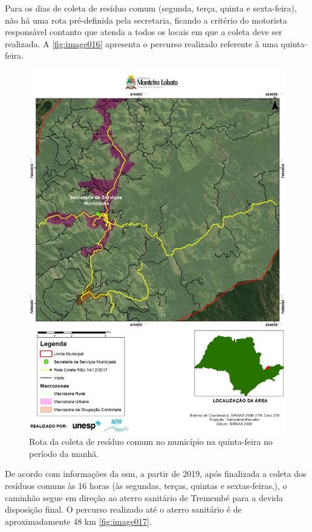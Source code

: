 Para os dias de coleta de resíduo comum (segunda, terça, quinta e sexta-feira), não há uma rota pré-definida pela secretaria, ficando a critério do motorista responsável contanto que atenda a todos os locais em que a coleta deve ser realizada. A \autoref{fig:image016} apresenta o percurso realizado referente à uma quinta-feira.

\begin{figure}
	\centering
	\includegraphics[width=1\linewidth]{produtos/prodtres/image016}
	\caption{Rota da coleta de resíduo comum no município na quinta-feira no período da manhã.}
	\label{fig:image016}
\end{figure}

De acordo com informações da \gls{ssm}, a partir de 2019, após finalizada a coleta dos resíduos comuns às 16 horas (às segundas, terças, quintas e sextas-feiras,), o caminhão segue em direção ao aterro sanitário de Tremembé para a devida disposição final. O percurso realizado até o aterro sanitário é de aproximadamente 48 km \autoref{fig:image017}.

